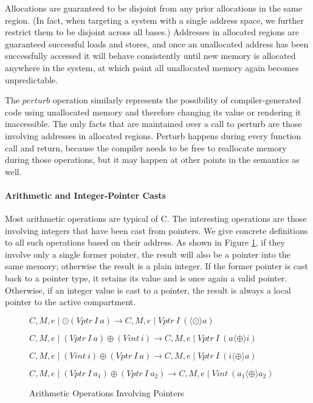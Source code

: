 Allocations are guaranteed to be disjoint from any prior allocations in the
same region. (In fact, when targeting a system with a single address space, we further restrict
them to be disjoint across all bases.) Addresses in allocated regions are guaranteed
successful loads and stores, and once an unallocated address has been successfully accessed
it will behave consistently until new memory is allocated anywhere in the system,
at which point all unallocated memory again becomes unpredictable.

The \(\mathit{perturb}\) operation similarly represents the possibility of compiler-generated
code using unallocated memory and therefore changing its value or rendering it inaccessible.
The only facts that are maintained over a call to perturb are those involving addresses in
allocated regions. Perturb happens during every function call and return, because the compiler
needs to be free to reallocate memory during those operations, but it may happen at other
points in the semantics as well.

\paragraph{Arithmetic and Integer-Pointer Casts}

Most arithmetic operations are typical of C. The interesting operations are those
involving integers that have been cast from pointers. We give concrete definitions
to all such operations based on their address. As shown in Figure \ref{ch5:fig:arith}, if they
involve only a single former pointer, the result will also be a pointer into the
same memory; otherwise the result is a plain integer. If the former pointer is cast
back to a pointer type, it retains its value and is once again a valid pointer.
Otherwise, if an integer value is cast to a pointer, the result is always a local
pointer to the active compartment.

\begin{figure}
  \small
  \judgment[Unop]
           {}
           {\(C,M,e \mid \odot (\mathit{Vptr} ~ I ~ a) \longrightarrow
             C,M,e \mid \mathit{Vptr} ~ I ~ (\langle \odot \rangle a)\)}
           
  \judgment[BinopPointerInteger]
           {}
           {\(C,M,e \mid (\mathit{Vptr} ~ I ~ a) \oplus
             (\mathit{Vint} ~ i) \longrightarrow
             C,M,e \mid \mathit{Vptr} ~ I ~ (a \langle \oplus \rangle i)\)}

  \judgment[BinopIntegerPointer]
           {}
           {\(C,M,e \mid (\mathit{Vint} ~ i) \oplus
             (\mathit{Vptr} ~ I ~ a) \longrightarrow
             C,M,e \mid \mathit{Vptr} ~ I ~ (i \langle \oplus \rangle a)\)}

  \judgment[BinopPointers]
           {}
           {\(C,M,e \mid (\mathit{Vptr} ~ I ~ a_1) \oplus
             (\mathit{Vptr} ~ I ~ a_2) \longrightarrow
             C,M,e \mid \mathit{Vint} ~ (a_1 \langle \oplus \rangle a_2)\)}

  \caption{Arithmetic Operations Involving Pointers}
  \label{ch5:fig:arith}
\end{figure}

